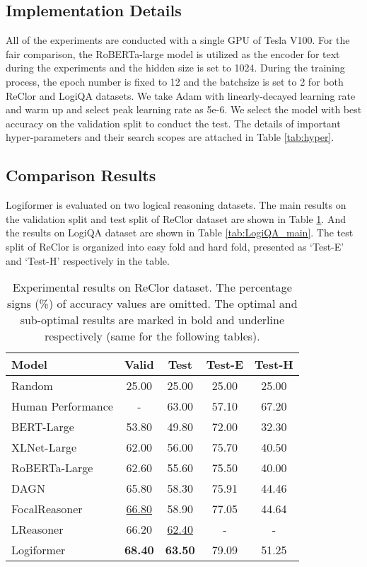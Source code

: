 \documentclass[sigconf]{acmart}
\begin{document}
\subsection{Implementation Details}
All of the experiments are conducted with a single GPU of Tesla V100. For the fair comparison, the RoBERTa-large model \cite{liu2019roberta} is utilized as the encoder for text during the experiments and the hidden size is set to 1024. During the training process, the epoch number is fixed to 12 and the batchsize is set to 2 for both ReClor and LogiQA datasets. We take Adam \cite{kingma2014adam} with linearly-decayed learning rate and warm up and select peak learning rate as 5e-6. We select the model with best accuracy on the validation split to conduct the test. The details of important hyper-parameters and their search scopes are attached in Table \ref{tab:hyper}.


\subsection{Comparison Results}
Logiformer is evaluated on two logical reasoning datasets. The main results on the validation split and test split of ReClor dataset are shown in Table \ref{tab:RECLOR_main}. And the results on LogiQA dataset are shown in Table \ref{tab:LogiQA_main}. The test split of ReClor is organized into easy fold and hard fold, presented as `Test-E' and `Test-H' respectively in the table.

\begin{table}[t]
	\centering
	\caption{Experimental results on ReClor dataset. The percentage signs (\%) of accuracy values are omitted. The optimal and sub-optimal results are marked in bold and underline respectively (same for the following tables).}
	\vspace{-0.2cm}
	\begin{tabular}{p{3.2cm}|cccc}
		\toprule
		\textbf{Model} &\textbf{Valid} &\textbf{Test} &\textbf{Test-E} &\textbf{Test-H}\\
		\hline
		Random &25.00 &25.00 &25.00 &25.00 \\
		Human Performance\cite{yu2019reclor}  &- &63.00 &57.10 &67.20 \\
		BERT-Large \cite{yu2019reclor} &53.80 &49.80 &72.00 &32.30 \\
		XLNet-Large\cite{yu2019reclor} &62.00 &56.00 &75.70 &40.50 \\
		RoBERTa-Large \cite{yu2019reclor}  &62.60 & 55.60 &75.50 &40.00 \\
		DAGN \cite{huang2021dagn} &65.80 & 58.30 &75.91 &44.46 \\
		FocalReasoner \cite{ouyang2021fact} & \underline{66.80} &58.90 &77.05 &44.64 \\
		LReasoner \cite{wang2021logic} & 66.20 & \underline{62.40} &- &-\\
		\hline
		Logiformer & \textbf{68.40} & \textbf{63.50} &79.09 &51.25\\
		\bottomrule
	\end{tabular}
	\label{tab:RECLOR_main}
	\vspace{-0.1cm}
\end{table}
\end{document}
